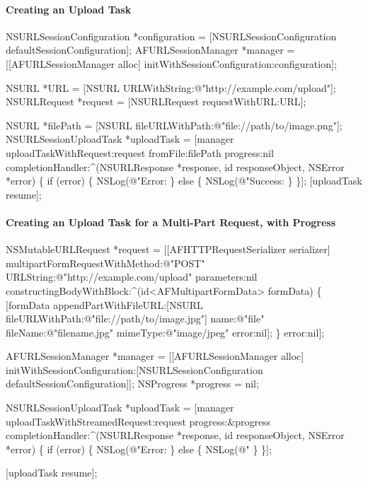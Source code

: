 \paragraph*{Creating an Upload Task}


\begin{DoxyCode}
NSURLSessionConfiguration *configuration = [NSURLSessionConfiguration defaultSessionConfiguration];
AFURLSessionManager *manager = [[AFURLSessionManager alloc] initWithSessionConfiguration:configuration];

NSURL *URL = [NSURL URLWithString:@"http://example.com/upload"];
NSURLRequest *request = [NSURLRequest requestWithURL:URL];

NSURL *filePath = [NSURL fileURLWithPath:@"file://path/to/image.png"];
NSURLSessionUploadTask *uploadTask = [manager uploadTaskWithRequest:request fromFile:filePath progress:nil
       completionHandler:^(NSURLResponse *response, id responseObject, NSError *error) \{
    if (error) \{
        NSLog(@"Error: %
    \} else \{
        NSLog(@"Success: %
    \}
\}];
[uploadTask resume];
\end{DoxyCode}


\paragraph*{Creating an Upload Task for a Multi-\/\+Part Request, with Progress}


\begin{DoxyCode}
NSMutableURLRequest *request = [[AFHTTPRequestSerializer serializer] multipartFormRequestWithMethod:@"POST"
       URLString:@"http://example.com/upload" parameters:nil constructingBodyWithBlock:^(id<AFMultipartFormData>
       formData) \{
        [formData appendPartWithFileURL:[NSURL fileURLWithPath:@"file://path/to/image.jpg"] name:@"file"
       fileName:@"filename.jpg" mimeType:@"image/jpeg" error:nil];
    \} error:nil];

AFURLSessionManager *manager = [[AFURLSessionManager alloc]
       initWithSessionConfiguration:[NSURLSessionConfiguration defaultSessionConfiguration]];
NSProgress *progress = nil;

NSURLSessionUploadTask *uploadTask = [manager uploadTaskWithStreamedRequest:request progress:&progress
       completionHandler:^(NSURLResponse *response, id responseObject, NSError *error) \{
    if (error) \{
        NSLog(@"Error: %
    \} else \{
        NSLog(@"%
    \}
\}];

[uploadTask resume];
\end{DoxyCode}


